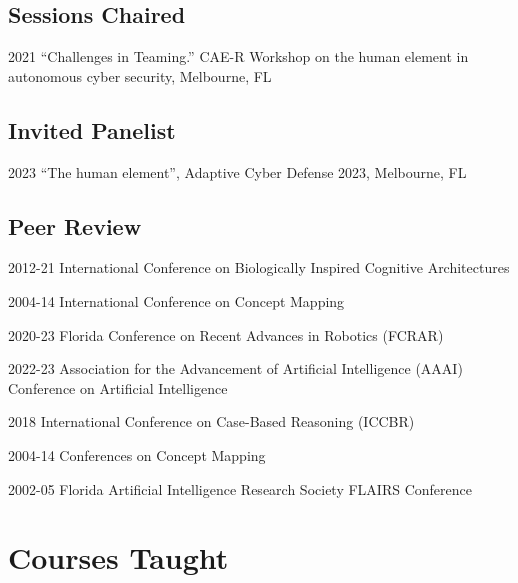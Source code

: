 \documentclass[12pt,letterpaper]{report}
\begin{document}
    \subsection*{Sessions Chaired}

    \begin{tablist}

        \item[2021] \tab{}\enquote{Challenges in Teaming.} CAE-R Workshop on the human element in autonomous cyber security, Melbourne, FL

    \end{tablist}

    \subsection*{Invited Panelist}

    \begin{tablist}
      \item[2023] \tab{}``The human element'', Adaptive Cyber Defense 2023, Melbourne, FL
    \end{tablist}

    \subsection*{Peer Review}

    \begin{tablist}
        \item[2012-21] \tab{}International Conference on Biologically Inspired Cognitive Architectures
        \item[2004-14] \tab{}International Conference on Concept Mapping
        \item[2020-23] \tab{}Florida Conference on Recent Advances in Robotics (FCRAR)
        \item[2022-23] \tab{}Association for the Advancement of Artificial Intelligence (AAAI) Conference on Artificial Intelligence
        \item[2018] \tab{}International Conference on Case-Based Reasoning (ICCBR)
        \item[2004-14] \tab{}Conferences on Concept Mapping 
        \item[2002-05] \tab{}Florida Artificial Intelligence Research Society FLAIRS Conference
    \end{tablist}


    \section*{Courses Taught}
\end{document}
